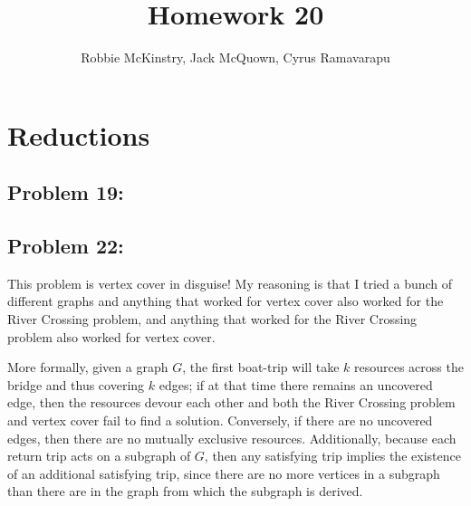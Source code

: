 \documentclass[12pt]{article}
\begin{document}
\title{Homework 20}
\author{Robbie McKinstry, Jack McQuown, Cyrus Ramavarapu}
\renewcommand{\today}{18 September 2016}
\renewcommand{\baselinestretch}{1.5}
\maketitle

\section*{Reductions}
\subsection*{Problem 19: }
\subsection*{Problem 22: }

This problem is vertex cover in disguise! My reasoning is that I tried a bunch of different graphs and anything that worked for vertex cover also worked for the River Crossing problem, and anything that worked for the River Crossing problem also worked for vertex cover.

More formally, given a graph $G$, the first boat-trip will take $k$ resources across the bridge and thus covering $k$ edges; if at that time there remains an uncovered edge, then the resources devour each other and both the River Crossing problem and vertex cover fail to find a solution. Conversely, if there are no uncovered edges, then there are no mutually exclusive resources. Additionally, because each return trip acts on a subgraph of $G$, then any satisfying trip implies the existence of an additional satisfying trip, since there are no more vertices in a subgraph than there are in the graph from which the subgraph is derived. 
\end{document}
